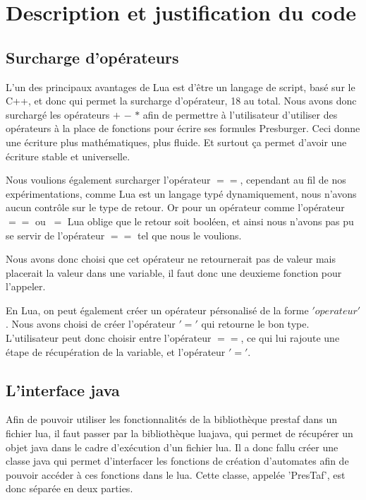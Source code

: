 \section{Description et justification du code}

\subsection{Surcharge d'opérateurs}

L'un des principaux avantages de Lua est d'être un langage de script, basé sur le C++, et donc qui permet la surcharge d'opérateur, 18 au total. Nous avons donc surchargé les opérateurs $+$ $-$ $*$ afin de permettre à l'utilisateur d'utiliser des opérateurs à la place de fonctions pour écrire ses formules Presburger. Ceci donne une écriture plus mathématiques, plus fluide. Et surtout ça permet d'avoir une écriture stable et universelle.\\\par

Nous voulions également surcharger l'opérateur $==$, cependant au fil de nos expérimentations, comme Lua est un langage typé dynamiquement, nous n'avons aucun contrôle sur le type de retour. Or pour un opérateur comme l'opérateur $==$ ou $~=$ Lua oblige que le retour soit booléen, et ainsi nous n'avons pas pu se servir de l'opérateur $==$ tel que nous le voulions.\\\par
 
Nous avons donc choisi que cet opérateur ne retournerait pas de valeur mais placerait la valeur dans une variable, il faut donc une deuxieme fonction pour l'appeler.\\\par

En Lua, on peut également créer un opérateur pérsonalisé de la forme $'operateur'$. Nous avons choisi de créer l'opérateur $'='$ qui retourne le bon type. L'utilisateur peut donc choisir entre l'opérateur $==$, ce qui lui rajoute une étape de récupération de la variable, et l'opérateur $'='$.

\subsection{L’interface java}

Afin de pouvoir utiliser les fonctionnalités de la bibliothèque prestaf dans un fichier lua, il faut passer par la bibliothèque luajava, qui permet de récupérer un objet java dans le cadre d'exécution d’un fichier lua. Il a donc fallu créer une classe java qui permet d’interfacer les fonctions de création d’automates afin de pouvoir accéder à ces fonctions dans le lua. Cette classe, appelée 'PresTaf', est donc séparée en deux parties.\\\par 

